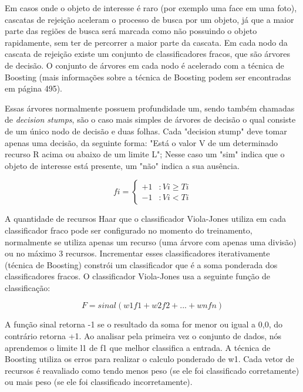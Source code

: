 Em casos onde o objeto de interesse é raro (por exemplo uma face em uma foto), cascatas de rejeição aceleram o processo de busca por um objeto, já que a maior parte das regiões de busca será marcada como não possuindo o objeto rapidamente, sem ter de percorrer a maior parte da cascata. Em cada nodo da cascata de rejeição existe um conjunto de classificadores fracos, que são árvores de decisão. O conjunto de árvores em cada nodo é acelerado com a técnica de Boosting (mais informações sobre a técnica de Boosting podem ser encontradas em \cite{learningOpenCV} página 495).

 Essas árvores normalmente possuem profundidade um, sendo também chamadas de \textit{decision stumps}, são o caso mais simples de árvores de decisão o qual consiste de um único nodo de decisão e duas folhas. Cada "decision stump" deve tomar apenas uma decisão, da seguinte forma: "Está o valor V de um determinado recurso R acima ou abaixo de um limite L"; Nesse caso um "sim" indica que o objeto de interesse está presente, um "não" indica a sua ausência.

\begin{displaymath}
   f{i} = \left\{
     \begin{array}{lr}
       +1 & : V{i} \geq T{i} \\
       -1 & : V{i} < T{i} 
     \end{array}
   \right.
\end{displaymath}

A quantidade de recursos Haar que o classificador Viola-Jones utiliza em cada classificador fraco pode ser configurado no momento do treinamento, normalmente se utiliza apenas um recurso (uma árvore com apenas uma divisão) ou no máximo 3 recursos. Incrementar esses classificadores iterativamente (técnica de Boosting) constrói um classificador que é a soma ponderada dos classificadores fracos. O classificador Viola-Jones usa a seguinte função de classificação:

\begin{equation}
F = sinal(w{1}f{1} + w{2}f{2} + ... + w{n}f{n})
\end{equation}

A função sinal retorna -1 se o resultado da soma for menor ou igual a 0,0, do contrário retorna +1. Ao analisar pela primeira vez o conjunto de dados, nós aprendemos o limite l1 de f1 que melhor classifica a entrada. A técnica de Boosting utiliza os erros para realizar o calculo ponderado de w1. Cada vetor de recursos é reavaliado como tendo menos peso (se ele foi classificado corretamente) ou mais peso (se ele foi classificado incorretamente). 

